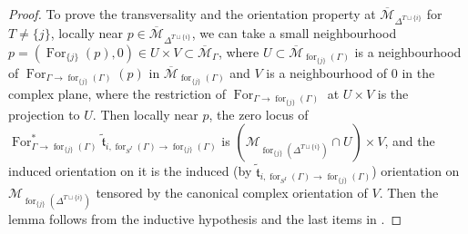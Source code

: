 \documentclass[11pt]{amsart}
\theoremstyle{definition}
\theoremstyle{remark}
\renewcommand{\for}{\operatorname{for}}
\newcommand{\For}{\operatorname{For}}
\newcommand{\<}{\left<}
\renewcommand{\>}{\right>}
\numberwithin{equation}{section}
\def\Mbar{{\overline{\mathcal M}}}
\begin{document}
\begin{proof}
To prove the transversality and the orientation property at $\Mbar_{\Delta^{{T\sqcup\{i\}}}}$ for %
$T\ne \{j\}$, locally %
near $p\in \Mbar_{\Delta^{{T\sqcup\{i\}}}}$, we can take a small neighbourhood $p=(\For_{\{j\}}(p),0)\in U\times V \subset \Mbar_{\Gamma}$, where $U\subset \Mbar_{\for_{\{j\}}(\Gamma)}$ is a neighbourhood of $\For_{\Gamma \to \for_{\{j\}}(\Gamma)}(p)$ in $ \Mbar_{\for_{\{j\}}(\Gamma)}$ and $V$ is a neighbourhood of 0 in the complex plane, where the restriction of $\For_{\Gamma \to \for_{\{j\}}(\Gamma)}$ at $U\times V$ is the projection to $U$. Then locally near $p$, the zero locus of $\For_{\Gamma\to \for_{\{j\}}(\Gamma)}^* \tilde{\mathfrak t}_{i,\for_{S^I}(\Gamma)\to \for_{\{j\}}(\Gamma)}$ is $(\mathcal M_{\for_{\{j\}}(\Delta^{T\sqcup\{i\}})}\cap U)\times V$, and the induced orientation on it is the %
induced (by $\tilde{\mathfrak t}_{i,\for_{S^I}(\Gamma)\to\for_{\{j\}}(\Gamma)}$) orientation on %
$\mathcal M_{\for_{\{j\}}(\Delta^{T\sqcup\{i\}})}$ tensored by the canonical complex orientation of $V$. %
Then the lemma follows %
from the inductive hypothesis and the last items %
in \cite[Proposition 3.1 and Proposition 3.3]{TZ1}.

\end{proof}
\end{document}
